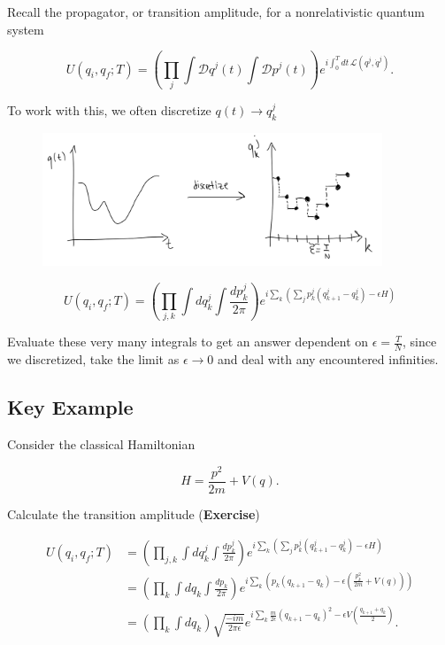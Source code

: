 \noindent Recall the propagator, or transition amplitude, for a nonrelativistic quantum system

\begin{equation}
U(q_i, q_f; T) = \left( \prod_j \int \mathcal{D} q^j (t) \int \mathcal{D} p^j (t) \right) e^{i \int^T_0 dt \, \mathcal{L} (q^j, \dot{q}^j)}.
\end{equation}

\noindent To work with this, we often discretize $q(t) \rightarrow q^j_k$

\begin{figure}[H]
	\centering
	\includegraphics[width=4in]{images/discretize.png}
\end{figure}

\begin{equation}
U(q_i, q_f; T) = \left( \prod_{j, k} \int dq^j_k \int \frac{dp^j_k}{2\pi} \right) e^{i \sum_k (\sum_j p_k^j (q_{k+1}^j - q_k^j ) - \epsilon H)}
\end{equation}

\noindent Evaluate these very many integrals to get an answer dependent on $\epsilon = \frac{T}{N}$, since we discretized, take the limit as $\epsilon \rightarrow 0$ and deal with any encountered infinities.

\subsection*{Key Example}

\noindent Consider the classical Hamiltonian

\begin{equation}
H = \frac{p^2}{2 m} + V(q).
\end{equation}

\noindent Calculate the transition amplitude (\textbf{Exercise})

\begin{align}
U(q_i, q_f; T) &= \left( \prod_{j, k} \int dq^j_k \int \frac{dp^j_k}{2\pi} \right) e^{i \sum_k (\sum_j p_k^j (q_{k+1}^j - q_k^j ) - \epsilon H)} \\
&=  \left( \prod_{k} \int dq_k \int \frac{dp_k}{2\pi} \right) e^{i \sum_k (p_k (q_{k+1} - q_k ) - \epsilon (\frac{p_k^2}{2m} + V(q)) )} \\
&= \left( \prod_k \int dq_k \right) \sqrt{\frac{-im}{2\pi \epsilon}} e^{i \sum_k \frac{m}{2\epsilon} (q_{k+1} - q_k)^2 - \epsilon V\left(\frac{q_{k+1} + q_k}{2}\right)}.
\end{align}

